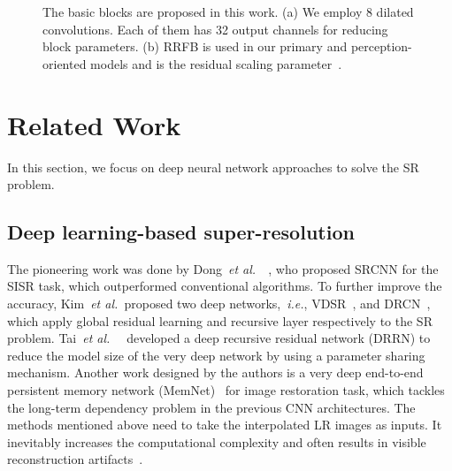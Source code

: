 \documentclass[preprint]{elsarticle}
\newcommand{\etal}{\textit{et al.~}}
\newcommand{\ie}{\textit{i.e.}}
\begin{document}
\begin{figure*}[htpb]
	\begin{center}
		\hfil
		\caption{The basic blocks are proposed in this work. (a) We employ 8 dilated convolutions. Each of them has 32 output channels for reducing block parameters. (b) RRFB is used in our primary and perception-oriented models and  is the residual scaling parameter~\cite{EDSR,ESRGAN}.}
		\label{fig:block}
	\end{center}
\end{figure*}

\section{Related Work}\label{sec:related-work}
In this section, we focus on deep neural network approaches to solve the SR problem.
\subsection{Deep learning-based super-resolution}
The pioneering work was done by Dong~\etal~\cite{SRCNN,SRCNN-Ex}, who proposed SRCNN for the SISR task, which outperformed conventional algorithms. To further improve the accuracy, Kim~\etal proposed two deep networks,~\ie, VDSR~\cite{VDSR}, and DRCN~\cite{DRCN}, which apply global residual learning and recursive layer respectively to the SR problem. Tai~\etal~\cite{DRRN} developed a deep recursive residual network (DRRN) to reduce the model size of the very deep network by using a parameter sharing mechanism. Another work designed by the authors is a very deep end-to-end persistent memory network (MemNet)~\cite{MemNet} for image restoration task, which tackles the long-term dependency problem in the previous CNN architectures. The methods mentioned above need to take the interpolated LR images as inputs. It inevitably increases the computational complexity and often results in visible reconstruction artifacts~\cite{LapSRN}.
\end{document}
